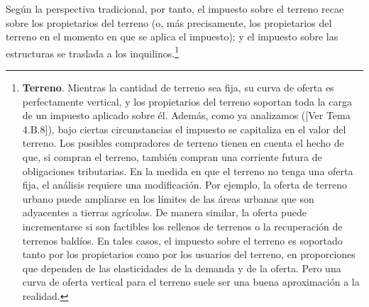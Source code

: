 \documentclass[10pt,a4paper]{article}
\newcommand{\authorfont}[1]{{\fontfamily{EBGaramond-TLF}\selectfont #1}}
\begin{document}
Según la perspectiva tradicional, por tanto, el impuesto sobre el terreno recae sobre los propietarios del terreno (o, más precisamente, los propietarios del terreno en el momento en que se aplica el impuesto); y el impuesto sobre las estructuras se traslada a los inquilinos.\footnote{%
    \textbf{Terreno}. Mientras la cantidad de terreno sea fija, su curva de oferta es perfectamente vertical, y los propietarios del terreno soportan toda la carga de un impuesto aplicado sobre él. Además, como ya analizamos ([\authorfont{Ver Tema 4.B.8}]), bajo ciertas circunstancias el impuesto se capitaliza en el valor del terreno. Los posibles compradores de terreno tienen en cuenta el hecho de que, si compran el terreno, también compran una corriente futura de obligaciones tributarias. En la medida en que el terreno no tenga una oferta fija, el análisis requiere una modificación. Por ejemplo, la oferta de terreno urbano puede ampliarse en los límites de las áreas urbanas que son adyacentes a tierras agrícolas. De manera similar, la oferta puede incrementarse si son factibles los rellenos de terrenos o la recuperación de terrenos baldíos. En tales casos, el impuesto sobre el terreno es soportado tanto por los propietarios como por los usuarios del terreno, en proporciones que dependen de las elasticidades de la demanda y de la oferta. Pero una curva de oferta vertical para el terreno suele ser una buena aproximación a la realidad.

}
\end{document}

